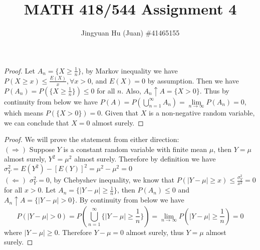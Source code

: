 \documentclass[10pt]{article}
\newenvironment{problem}[2][Problem]{\begin{trivlist}
\item[\hskip \labelsep {\bfseries #1}\hskip \labelsep {\bfseries #2.}]}{\end{trivlist}}
\begin{document}
 
\title{\vspace{-1.6cm}\large MATH 418/544 Assignment 4}
\author{\large Jingyuan Hu (Juan) \#41465155}
\date{}
\maketitle
 
\begin{problem}{1(a)}
\end{problem}
 
\begin{proof}
Let $A_{n} = \{X \ge \frac{1}{n}\}$, by Markov inequality we have $P(X \ge x) \le \frac{E(X)}{x}, \forall x > 0$, and $E(X) = 0$ by assumption. Then we have $P(A_{n}) = P(\{X \ge \frac{1}{n}\}) \le 0$ for all $n$. Also, $A_{n} \uparrow A = \{X > 0\}$. Thus by continuity from below we have $P(A) = P(\bigcup\limits_{n=1}^{\infty}A_{n}) = \lim\limits_{n\rightarrow \infty}P(A_{n}) = 0$, which means $P(\{X > 0\})=0$. Given that $X$ is a non-negative random variable, we can conclude that $X = 0$ almost surely.
\end{proof}

\begin{problem}{1(b)}
\end{problem}
 
\begin{proof} We will prove the statement from either direction:\\
$(\Rightarrow)$ Suppose $Y$ is a constant random variable with finite mean $\mu$, then $Y = \mu$ almost surely, $Y^2 = \mu^2$ almost surely. Therefore by definition we have $\sigma_{Y}^2 = E(Y^2) - [E(Y)]^2 = \mu^2 - \mu^2 = 0$\\
$(\Leftarrow)$ $\sigma_{Y}^2 = 0$, by Chebyshev inequality, we know that $P(|Y-\mu|\ge x) \le \frac{\sigma_{Y}^2}{x^2} = 0$ for all $x >0$. Let $A_{n} = \{|Y-\mu|\ge \frac{1}{n}\}$, then $P(A_{n}) \le 0$ and $A_{n} \uparrow A = \{|Y-\mu| > 0\}$. By continuity from below we have 
$$P(|Y-\mu| > 0) = P(\bigcup\limits_{n=1}^{\infty} \{|Y-\mu|\ge \frac{1}{n}\}) = \lim\limits_{n\rightarrow \infty}P(|Y-\mu|\ge \frac{1}{n}) = 0$$ where $|Y-\mu| \ge 0$. Therefore $Y - \mu = 0$ almost surely, thus $Y = \mu$ almost surely.
\end{proof}

\begin{problem}{2}
\end{problem}
 
\end{document}
